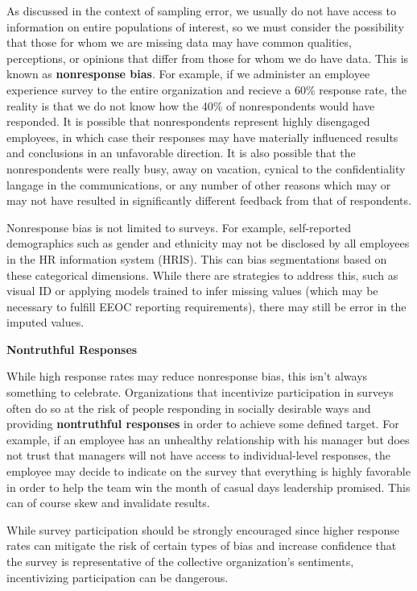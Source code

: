 \documentclass[]{book}
\begin{document}
As discussed in the context of sampling error, we usually do not have access to information on entire populations of interest, so we must consider the possibility that those for whom we are missing data may have common qualities, perceptions, or opinions that differ from those for whom we do have data. This is known as \textbf{nonresponse bias}. For example, if we administer an employee experience survey to the entire organization and recieve a 60\% response rate, the reality is that we do not know how the 40\% of nonrespondents would have responded. It is possible that nonrespondents represent highly disengaged employees, in which case their responses may have materially influenced results and conclusions in an unfavorable direction. It is also possible that the nonrespondents were really busy, away on vacation, cynical to the confidentiality langage in the communications, or any number of other reasons which may or may not have resulted in significantly different feedback from that of respondents.

Nonresponse bias is not limited to surveys. For example, self-reported demographics such as gender and ethnicity may not be disclosed by all employees in the HR information system (HRIS). This can bias segmentations based on these categorical dimensions. While there are strategies to address this, such as visual ID or applying models trained to infer missing values (which may be necessary to fulfill EEOC reporting requirements), there may still be error in the imputed values.

\textbf{Nontruthful Responses}

While high response rates may reduce nonresponse bias, this isn't always something to celebrate. Organizations that incentivize participation in surveys often do so at the risk of people responding in socially desirable ways and providing \textbf{nontruthful responses} in order to achieve some defined target. For example, if an employee has an unhealthy relationship with his manager but does not trust that managers will not have access to individual-level responses, the employee may decide to indicate on the survey that everything is highly favorable in order to help the team win the month of casual days leadership promised. This can of course skew and invalidate results.

While survey participation should be strongly encouraged since higher response rates can mitigate the risk of certain types of bias and increase confidence that the survey is representative of the collective organization's sentiments, incentivizing participation can be dangerous.
\end{document}
